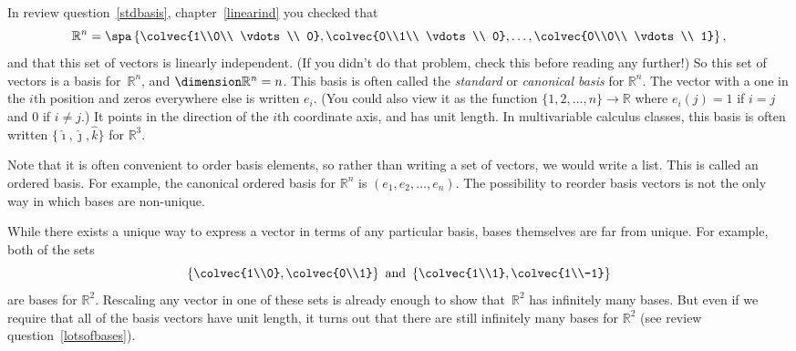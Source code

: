 In review question~\ref{stdbasis}, chapter~\ref{linearind} you checked that
\[
\mathbb{R}^n = \spa \left\{ \colvec{1\\0\\ \vdots \\ 0}, 
\colvec{0\\1\\ \vdots \\ 0}, \ldots, \colvec{0\\0\\ \vdots \\ 1}\right\},
\]
and that this set of vectors is linearly independent. (If you didn't do that problem, check this before reading any further!)  So this set of vectors is a basis for~$\mathbb{R}^n$, and $\dimension \mathbb{R}^n=n$.  This basis is often called the \emph{standard} or \emph{canonical basis} for $\mathbb{R}^n$.  The vector with a one in the $i$th position and zeros everywhere else is written 
$e_i$. (You could also view it as the function $\{1,2,\ldots,n\}\to {\mathbb R}$ where $e_i(j)=1$ if $i=j$ and $0$ if $i\neq j$.)  It points in the direction of the $i$th coordinate axis, and has unit length.  In multivariable calculus classes, this basis is often written $\{ \hat\imath,\hat\jmath,\hat k \}$ for $\mathbb{R}^3$. 


Note that it is often convenient to order  basis elements, so rather than writing a set
of vectors, we would write a list. This is called an ordered basis. For example, the canonical ordered basis for ${\mathbb R^n}$ is $(e_1,e_2,\ldots,e_n)$. The possibility to reorder basis vectors is not the only way in which bases are non-unique.

\begin{remark}
While there exists a unique way to express a vector in terms of any particular basis, bases themselves are far from unique.
For example, both of the sets 
\[
\left\{ \colvec{1\\0}, \colvec{0\\1} \right\} \text{ and }
\left\{ \colvec{1\\1}, \colvec{1\\-1} \right\}
\]
are bases for $\mathbb{R}^2$.  Rescaling any vector in one of these sets is already enough to show that~$\mathbb{R}^2$ has infinitely many bases.  But even if we require that all of the basis vectors have unit length, it turns out that there are still infinitely many bases for $\mathbb{R}^2$ (see review question~\ref{lotsofbases}).
\end{remark}


